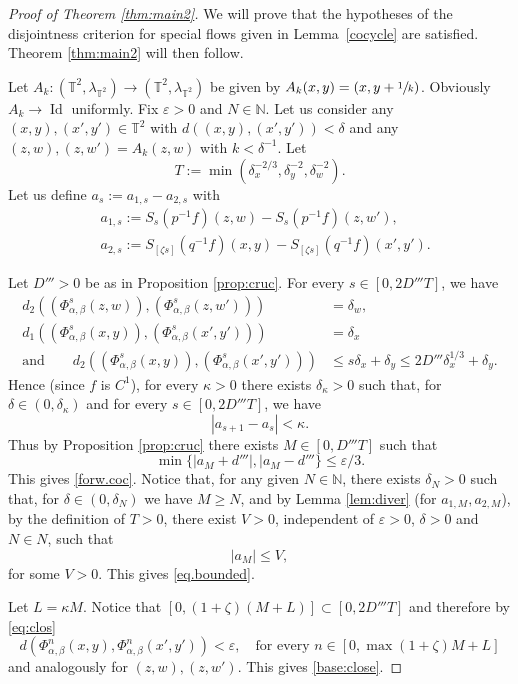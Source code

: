 \documentclass[10pt]{amsart}
\let\epsilon\varepsilon
\DeclareMathOperator{\Id}{Id}
\theoremstyle{definition}
\theoremstyle{plain}
\newcommand\NN{\mathbb{N}}
\newcommand\TT{\mathbb{T}}
\begin{document}
\begin{proof}[Proof of Theorem \ref{thm:main2}] We will prove that the hypotheses of the disjointness criterion for special flows given in
Lemma~\ref{cocycle} are satisfied. Theorem \ref{thm:main2} will then follow.

Let $A_k:(\TT^2,\lambda_{\TT^2})\to (\TT^2,\lambda_{\TT^2})$ be given by $A_k(x,y)=(x,y+\sfrac{1}{k})$. Obviously $A_k\to \Id$ uniformly.
Fix $\epsilon>0$ and $N\in \NN$. Let us consider any
$(x,y),(x',y')\in \TT^2$ with $d((x,y),(x',y'))<\delta$ and any $(z,w),(z,w')=A_k(z,w)$ with $k<\delta^{-1}$. Let
\[
T:=\min(\delta_x^{-2/3},\delta_y^{-2},\delta_w^{-2}).
\]
Let us define $a_s:=a_{1,s}-a_{2,s}$ with
\[
\begin{aligned}
&a_{1,s}:=S_s(p^{-1}f)(z,w)-S_s(p^{-1}f)(z,w'), \\ & a_{2,s}:=S_{[\zeta s]}(q^{-1}f)(x,y)-S_{[\zeta s]}(q^{-1}f)(x',y').
\end{aligned}
\]

Let $D'''>0$ be as in Proposition \ref{prop:cruc}. For every $s\in [0,2D'''T]$, we have
\begin{equation}\label{eq:clos}
\begin{split}
d_2((\Phi_{\alpha,\beta}^s(z,w)),(\Phi_{\alpha,\beta}^s(z,w')))&=\delta_w, \\
d_1((\Phi_{\alpha,\beta}^s(x,y)),(\Phi_{\alpha,\beta}^s(x',y')))&=
\delta_x\\
\text{and}\qquad
d_2((\Phi_{\alpha,\beta}^s(x,y)),(\Phi_{\alpha,\beta}^s(x',y')))&\leq s\delta_x+\delta_y\leq 2D'''\delta_x^{1/3}+\delta_y.
\end{split}
\end{equation}
Hence (since $f$ is $C^1$), for every $\kappa>0$ there exists $\delta_\kappa>0$ such that, for $\delta\in (0,\delta_\kappa)$ and
for every $s\in [0,2D'''T]$, we have
\[|a_{s+1}-a_s|<\kappa.\]
Thus by Proposition \ref{prop:cruc} there exists $M\in [0,D'''T]$ such that
\[
\min\{ |a_M+d'''|, |a_M- d''' \} \leq \epsilon/3.
\]
This gives \eqref{forw.coc}.
Notice that, for any given $N\in \NN$, there exists $\delta_N>0$ such that, for $\delta \in (0,\delta_N)$ we have
$M\geq N$, and by Lemma \ref{lem:diver} (for $a_{1,M},a_{2,M}$), by the definition of $T>0$,
there exist $V>0$, independent of $\epsilon>0$, $\delta>0$ and $N\in N$, such that
\[
|a_M|\leq V,
\]
for some $V>0$. This gives \eqref{eq.bounded}.

Let $L=\kappa M$. Notice that $[0,(1+\zeta)(M+L)]\subset [0,2D'''T]$ and therefore by \eqref{eq:clos}
\begin{equation*}
d(\Phi_{\alpha,\beta}^n(x,y),\Phi_{\alpha,\beta}^n(x',y'))<\epsilon, \quad\text{for every } n\in [0,\max(1+\zeta)M+L]
\end{equation*}
and analogously for $(z,w), (z,w')$. This gives \eqref{base:close}.


\end{proof}
\end{document}

